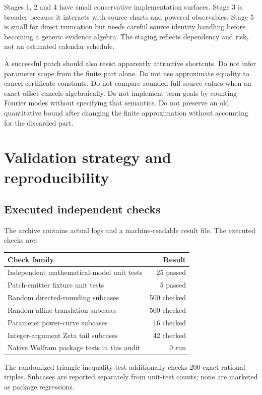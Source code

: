 \documentclass[11pt,a4paper]{article}
\begin{document}
Stages 1, 2 and 4 have small conservative implementation surfaces. Stage 3 is broader because it interacts with source charts and powered observables. Stage 5 is small for direct truncation but needs careful source identity handling before becoming a generic evidence algebra. The staging reflects dependency and risk, not an estimated calendar schedule.

A successful patch should also resist apparently attractive shortcuts. Do not infer parameter scope from the finite part alone. Do not use approximate equality to cancel certificate constants. Do not compare rounded full source values when an exact offset cancels algebraically. Do not implement term goals by counting Fourier modes without specifying that semantics. Do not preserve an old quantitative bound after changing the finite approximation without accounting for the discarded part.

\section{Validation strategy and reproducibility}\label{sec:validation}

\subsection{Executed independent checks}

The archive contains actual logs and a machine-readable result file. The executed checks are:
\begin{center}
\begin{tabular}{@{}L{102mm}r@{}}
\toprule Check family & Result\\\midrule
Independent mathematical-model unit tests & 25 passed\\
Patch-emitter fixture unit tests & 5 passed\\
Random directed-rounding subcases & 500 checked\\
Random affine translation subcases & 500 checked\\
Parameter power-curve subcases & 16 checked\\
Integer-argument Zeta tail subcases & 42 checked\\
Native Wolfram package tests in this audit & 0 run\\
\bottomrule
\end{tabular}
\end{center}
The randomized triangle-inequality test additionally checks 200 exact rational triples. Subcases are reported separately from unit-test counts; none are marketed as package regressions.
\end{document}
